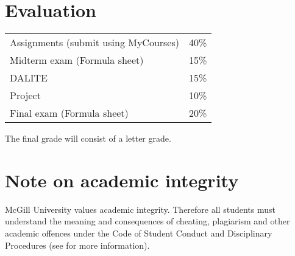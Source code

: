 \documentclass[]{article}
\begin{document}
\section{Evaluation}
\noindent
\begin{tabular}{lc}
Assignments (submit using MyCourses) & 40\%\\
Midterm exam (Formula sheet) & 15\%  \\
DALITE & 15\%\\
Project & 10\% \\
Final exam (Formula sheet) & 20\%
\end{tabular}
\newline

\vspace{.51cm}

\noindent
The final grade will consist of a letter grade.

\section{Note on academic integrity}

McGill University values academic integrity. Therefore all students must understand the meaning and consequences of cheating, plagiarism and other academic offences under the Code of Student Conduct and Disciplinary Procedures (see \href{http://www.mcgill.ca/integrity/}{\color{blue}{http://www.mcgill.ca/integrity/}} for more information).
\end{document}
